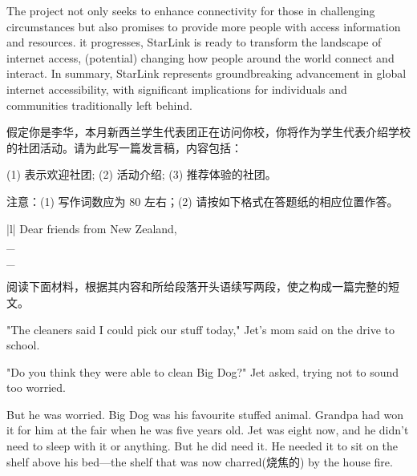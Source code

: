 \documentclass{英语试卷}
\begin{document}
\par The project not only seeks to enhance connectivity for those in challenging circumstances but also promises to provide more people with access  information and resources.  it progresses, StarLink is ready to transform the landscape of internet access,  (potential) changing how people around the world connect and interact. In summary, StarLink represents  groundbreaking advancement in global internet accessibility, with significant implications for individuals and communities traditionally left behind.\par
{}
\par 假定你是李华，本月新西兰学生代表团正在访问你校，你将作为学生代表介绍学校的社团活动。请为此写一篇发言稿，内容包括：\par
\par (1) 表示欢迎社团; (2) 活动介绍; (3) 推荐体验的社团。\par
\par 注意：(1) 写作词数应为 80 左右；(2) 请按如下格式在答题纸的相应位置作答。\par
\par\vspace{0.4em}
\begin{center}\begin{tabular}{{|l|}}
\hline
Dear friends from New Zealand, \\
\_ \\
\_ \\
\hline
\end{tabular}\end{center}
\vspace{0.4em}
\par 阅读下面材料，根据其内容和所给段落开头语续写两段，使之构成一篇完整的短文。\par
\par "The cleaners said I could pick our stuff today," Jet's mom said on the drive to school.\par
\par "Do you think they were able to clean Big Dog?" Jet asked, trying not to sound too worried.\par
\par But he was worried. Big Dog was his favourite stuffed animal. Grandpa had won it for him at the fair when he was five years old. Jet was eight now, and he didn't need to sleep with it or anything. But he did need it. He needed it to sit on the shelf above his bed—the shelf that was now charred(烧焦的) by the house fire.\par
\end{document}
